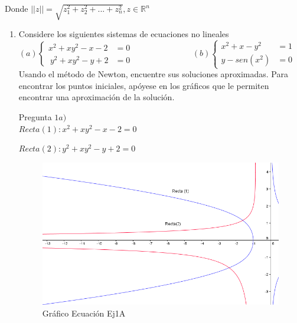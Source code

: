 \documentclass{udpreport}
\begin{document}
        Donde $||z||=\sqrt{z_{1}^{2} + z_{2}^2+...+z_{n}^{2}} , z \in \mathbb{R}^{n}$
    \begin{enumerate}   
        
        \item Considere los siguientes sistemas de ecuaciones no lineales\\
        
        \begin{math}
            (a)\left\lbrace
          \begin{array}{ll}
                x^2 + xy^2-x-2&=0 \\\
                y^2 + xy^2-y+2&=0
            \end{array}
            \right.
            \hspace{3cm}
            (b) \left\lbrace
           \begin{array}{ll}
                 x^2+x-y^2&=1  \\
                 y-sen(x^2)&=0 
            \end{array}
            \right.
        \end{math}\\
        
        Usando el método de Newton, encuentre sus soluciones aproximadas. Para encontrar los puntos iniciales, apóyese en los gráficos que le permiten encontrar una aproximación de la solución. 
        
        
        Pregunta $ 1a) $\\
        
            
            $ Recta(1) : x^2+xy^2-x-2=0 $
            
            $ Recta(2) : y^2 +xy^2-y+2=0 $
            
            \begin{figure}[h]
                \centering
                \includegraphics[width=15cm]{GraficoEcEj1a}
                 \caption{Gráfico Ecuación Ej1A}
            \end{figure}
            

\end{enumerate}
\end{document}
